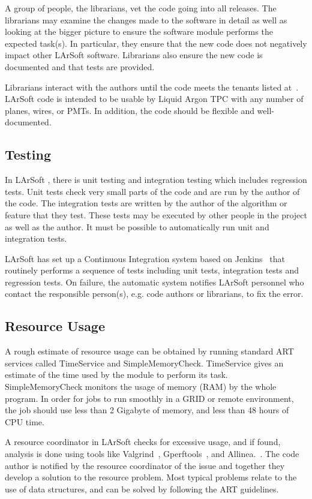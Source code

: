 \documentclass[12pt]{elsarticle}
\newcommand{\larsoft}{LArSoft }
\begin{document}
A group of people, the librarians, vet the code going into all releases. The librarians may examine the changes made to the software in detail as well as looking at the bigger picture to ensure the software module performs the expected task(s). In particular, they ensure that the new code does not negatively impact other \larsoft software. Librarians also ensure the new code is documented and that tests are provided.

Librarians interact with the authors until the code meets the tenants listed at~\cite{code-tenants}. \larsoft code is intended to be usable by Liquid Argon TPC with any number of planes, wires, or PMTs. In addition, the code should be flexible and well-documented. 

\subsection{Testing}

In \larsoft, there is unit testing and integration testing which includes regression tests. Unit tests check very small parts of the code and are run by the author of the code. 
The integration tests are written by the author of the algorithm or feature that they test. These tests may be executed by other people in the project as well as the author. It must be possible to automatically run unit and  integration tests.

\larsoft has set up a Continuous Integration system based on Jenkins~\cite{jenkins} that routinely performs a sequence of tests including unit tests, integration tests and regression tests. On failure, the automatic system notifies \larsoft personnel who contact the responsible person(s), e.g. code authors or librarians, to fix the error.

\subsection{Resource Usage}

A rough estimate of resource usage can be obtained by running standard ART services called TimeService and SimpleMemoryCheck. TimeService gives an estimate of the time used by the module to perform its task. SimpleMemoryCheck monitors the usage of memory (RAM) by the whole program. In order for jobs to run smoothly in a GRID or remote environment, the job should use less than 2 Gigabyte of memory, and less than 48 hours of CPU time.

A resource coordinator in \larsoft checks for excessive usage, and if found, analysis is done using tools like Valgrind~\cite{valgrind}, Gperftools~\cite{gperf}, and Allinea.~\cite {allinea}.
The code author is notified by the resource coordinator of the issue and together they develop a solution to the resource problem. Most typical problems relate to the use of data structures, and can be solved by following the ART guidelines.~\cite{art-guide}
 
\end{document}
